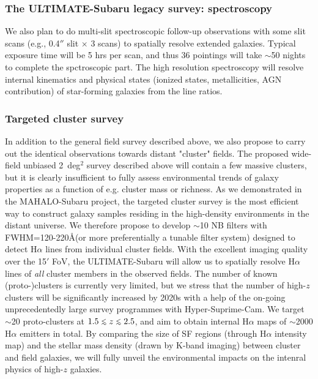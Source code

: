 \subsubsection{The ULTIMATE-Subaru legacy survey: spectroscopy}

We also plan to do multi-slit spectroscopic follow-up observations with some
slit scans (e.g., 0.4$''$ slit $\times$ 3 scans) to spatially resolve extended
galaxies. Typical exposure time will be 5 hrs per scan, and thus
36 pointings will take $\sim$50 nights to complete the spctroscopic part.
The high resolution spectroscopy will resolve internal kinematics and physical
states (ionized states, metallicities, AGN contribution) of star-forming galaxies
from the line ratios.

\subsubsection{Targeted cluster survey}

In addition to the general field survey described above, we also propose
to carry out the identical observations towards distant "cluster" fields. 
The proposed wide-field unbiased 2~deg$^2$ survey described above will 
contain a few massive clusters, but it is clearly insufficient to fully 
assess environmental trends of galaxy properties as a function of e.g. 
cluster mass or richness. 
As we demonstrated in the MAHALO-Subaru project, the targeted cluster 
survey is the most efficient way to construct galaxy samples residing
in the high-density environments in the distant universe. 
We therefore propose to develop 
$\sim$10 NB filters with FWHM=120-220\AA (or more preferentially a tunable filter system)
designed to detect H$\alpha$ lines from individual cluster fields. With the excellent 
imaging quality over the 15$'$ FoV, the ULTIMATE-Subaru will allow us to 
spatially resolve H$\alpha$ lines of {\it all} cluster members in the 
observed fields. The number of known (proto-)clusters is currently very 
limited, but we stress that the number of high-$z$ clusters will be 
significantly increased by 2020s with a help of the on-going unprecedentedly 
large survey programmes with Hyper-Suprime-Cam. We target $\sim$20 proto-clusters
at $1.5\lsim z\lsim 2.5$, and aim to obtain internal H$\alpha$ maps of 
$\sim$2000 H$\alpha$ emitters in total. By comparing the size of SF 
regions (through H$\alpha$ intensity map) and the stellar mass 
density (drawn by K-band imaging) between cluster and field galaxies, 
we will fully unveil the environmental impacts on the intenral physics
of high-$z$ galaxies. 

